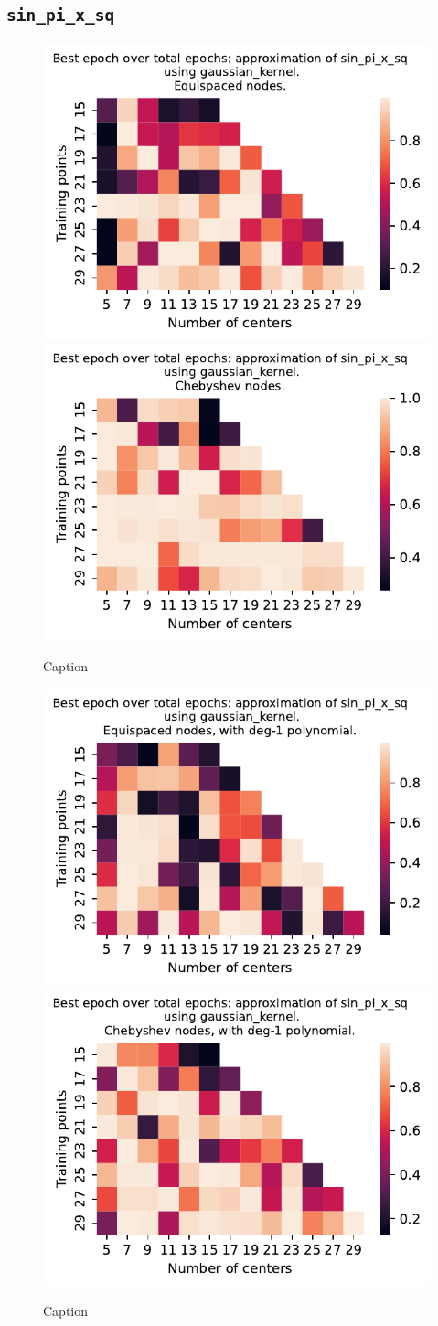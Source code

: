 \documentclass[12pt]{report} %
\begin{document}
\subsection*{\texttt{sin\_pi\_x\_sq}}

\begin{figure}[ht]
    \centering
    
    \includegraphics[width=.49\textwidth]{imagenes/experiments/1d/variational_epochs/sin_pi_x_sq-Kgaussian_kernel-Equi-epochs.pdf}
    \includegraphics[width=.49\textwidth]{imagenes/experiments/1d/variational_epochs/sin_pi_x_sq-Kgaussian_kernel-Cheb-epochs.pdf}
    \caption{Caption}
    \label{fig:epochs-sin-pi-x-sq-gaussian}
\end{figure}

\begin{figure}[ht]
    \centering
    
    \includegraphics[width=.49\textwidth]{imagenes/experiments/1d/variational_epochs/sin_pi_x_sq-Kgaussian_kernel-Poly-Equi-epochs.pdf}
    \includegraphics[width=.49\textwidth]{imagenes/experiments/1d/variational_epochs/sin_pi_x_sq-Kgaussian_kernel-Poly-Cheb-epochs.pdf}
    \caption{Caption}
    \label{fig:epochs-sin-pi-x-sq-gaussian-poly}
\end{figure}
\end{document}
